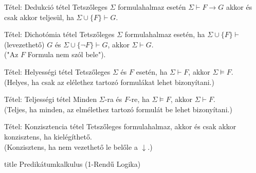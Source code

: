 \documentclass{beamer}
\begin{document}
\begin{frame}

\begin{block}{Tétel: Dedukció tétel}
Tetszőleges $\Sigma$ formulahalmaz esetén $\Sigma \vdash F \rightarrow G$ akkor és csak akkor teljesül, ha $\Sigma \cup \{F\} \vdash G$.
\end{block}

\begin{block}{Tétel: Dichotómia tétel}
Tetszőleges $\Sigma$ formulahalmaz esetén, ha $\Sigma \cup \{F\} \vdash$ (levezethető) $G$ és $\Sigma \cup \{\neg F\} \vdash G$, akkor $\Sigma \vdash G$.\\
("Az $F$ Formula nem szól bele").
\end{block}

\begin{block}{Tétel: Helyességi tétel}
Tetszőleges $\Sigma$ és $F$ esetén, ha $\Sigma \vdash F$, akkor $\Sigma \models F$.\\
(Helyes, ha csak az elélethez tartozó formulákat lehet bizonyítani.)
\end{block}

\begin{block}{Tétel: Teljességi tétel}
Minden $\Sigma$-ra és $F$-re, ha $\Sigma \models F$, akkor $\Sigma \vdash F$.\\
(Teljes, ha minden, az elmélethez tartozó formulát be lehet bizonyítani.)
\end{block}

\begin{block}{Tétel: Konzisztencia tétel}
Tetszőleges formulahalmaz, akkor és csak akkor konzisztens, ha kielégíthető.\\
(Konzisztens, ha nem vezethető le belőle a $\downarrow$.)
\end{block}

\end{frame}


\begin{frame}[plain]
\begin{beamercolorbox}[center]{title}
    {\Huge Predikátumkalkulus (1-Rendű Logika)}
\end{beamercolorbox}
\end{frame}
\end{document}
